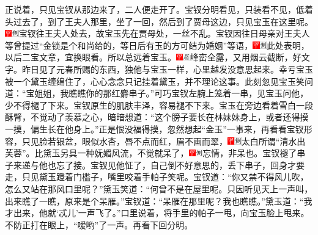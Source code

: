 正说着，只见宝钗从那边来了，二人便走开了。宝钗分明看见，只装看不见，低着头过去了，到了王夫人那里，坐了一回，然后到了贾母这边，只见宝玉在这里呢。{\includegraphics[width=3mm]{../Images/00002}\includegraphics[width=3mm]{../Images/00011}\footnotesize \kaishu 宝钗往王夫人处去，故宝玉先在贾母处，一丝不乱。}宝钗因往日母亲对王夫人等曾提过“金锁是个和尚给的，等日后有玉的方可结为婚姻”等语，{\includegraphics[width=3mm]{../Images/00002}\includegraphics[width=3mm]{../Images/00011}\footnotesize \kaishu 此处表明，以后二宝文章，宜换眼看。}所以总远着宝玉。{\includegraphics[width=3mm]{../Images/00002}\includegraphics[width=3mm]{../Images/00010}\footnotesize \kaishu 峰峦全露，又用烟云截断，好文字。}昨日见了元春所赐的东西，独他与宝玉一样，心里越发没意思起来。幸亏宝玉被一个黛玉缠绵住了，心心念念只记挂着黛玉，并不理论这事。此刻忽见宝玉笑问道：“宝姐姐，我瞧瞧你的那红麝串子。”可巧宝钗左腕上笼着一串，见宝玉问他，少不得褪了下来。宝钗原生的肌肤丰泽，容易褪不下来。宝玉在旁边看着雪白一段酥臂，不觉动了羡慕之心，暗暗想道：“这个膀子要长在林妹妹身上，或者还得摸一摸，偏生长在他身上。”正是恨没福得摸，忽然想起“金玉”一事来，再看看宝钗形容，只见脸若银盆，眼似水杏，唇不点而红，眉不画而翠，{\includegraphics[width=3mm]{../Images/00002}\includegraphics[width=3mm]{../Images/00011}\footnotesize \kaishu 太白所谓“清水出芙蓉”。}比黛玉另具一种妩媚风流，不觉就呆了，{\includegraphics[width=3mm]{../Images/00002}\includegraphics[width=3mm]{../Images/00011}\footnotesize \kaishu 忘情，非呆也。}宝钗褪了串子来递与他也忘了接。宝钗见他怔了，自己倒不好意思的，丢下串子，回身才要走，只见黛玉蹬着门槛子，嘴里咬着手帕子笑呢。宝钗道：“你又禁不得风儿吹，怎么又站在那风口里呢？”黛玉笑道：“何曾不是在屋里呢。只因听见天上一声叫，出来瞧了一瞧，原来是个呆雁。”宝钗道：“呆雁在那里呢？我也瞧瞧。”黛玉道：“我才出来，他就‘忒儿’一声飞了。”口里说着，将手里的帕子一甩，向宝玉脸上甩来。不防正打在眼上，“嗳哟”了一声。再看下回分明。

